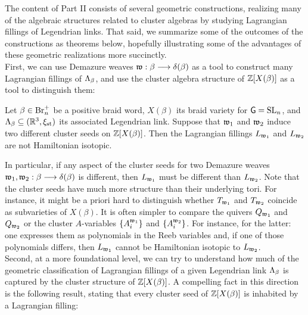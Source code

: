  The content of Part II consists of several geometric constructions, realizing many of the algebraic structures related to cluster algebras by studying Lagrangian fillings of Legendrian links. That said, we summarize some of the outcomes of the constructions as theorems below, hopefully illustrating some of the advantages of these geometric realizations more succinctly.\\

First, we can use Demazure weaves $\mathfrak{w}:\beta\longrightarrow\delta(\beta)$ as a tool to construct many Lagrangian fillings of $\Lambda_\beta$, and use the cluster algebra structure of $\mathbb{Z}[X(\beta)]$ as a tool to distinguish them:

\begin{fthm}\label{thm:symplectic_intro1}
Let $\beta\in\mbox{Br}_n^+$ be a positive braid word, $X(\beta)$ its braid variety for $\mathsf{G}=\operatorname{SL}_n$, and $\Lambda_\beta\subseteq(\mathbb{R}^3,\xi_{\text{st}})$ its associated Legendrian link. Suppose that $\mathfrak{w}_1$ and $\mathfrak{w}_2$ induce two different cluster seeds on $\mathbb{Z}[X(\beta)]$. Then the Lagrangian fillings $L_{\mathfrak{w}_1}$ and $L_{\mathfrak{w}_2}$ are not Hamiltonian isotopic.\\
\end{fthm}
\vspace{0.2cm}

\noindent In particular, if any aspect of the cluster seeds for two Demazure weaves $\mathfrak{w}_1,\mathfrak{w}_2:\beta\longrightarrow\delta(\beta)$ is different, then $L_{\mathfrak{w}_1}$ must be different than $L_{\mathfrak{w}_2}$. Note that the cluster seeds have much more structure than their underlying tori. For instance, it might be a priori hard to distinguish whether $T_{\mathfrak{w}_1}$ and $T_{\mathfrak{w}_2}$ coincide as subvarieties of $X(\beta)$. It is often simpler to compare the quivers $Q_{\mathfrak{w}_1}$ and $Q_{\mathfrak{w}_2}$ or the cluster $A$-variables $\{A_i^{\mathfrak{w}_1}\}$ and $\{A_i^{\mathfrak{w}_2}\}$. For instance, for the latter: one expresses them as polynomials in the Reeb variables and, if one of those polynomials differs, then $L_{\mathfrak{w}_1}$ cannot be Hamiltonian isotopic to $L_{\mathfrak{w}_2}$.\\

Second, at a more foundational level, we can try to understand how much of the geometric classification of Lagrangian fillings of a given Legendrian link $\Lambda_\beta$ is captured by the cluster structure of $\mathbb{Z}[X(\beta)]$. A compelling fact in this direction is the following result, stating that every cluster seed of $\mathbb{Z}[X(\beta)]$ is inhabited by a Lagrangian filling:

